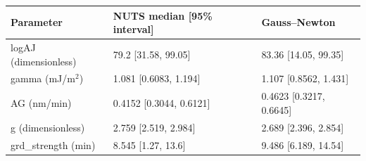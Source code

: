 \begin{tabular}{lll}
Parameter & NUTS median [95\% interval] & Gauss--Newton \\
\hline
logAJ (dimensionless) & 79.2 [31.58, 99.05] & 83.36 [14.05, 99.35] \\
gamma (mJ/m$^2$) & 1.081 [0.6083, 1.194] & 1.107 [0.8562, 1.431] \\
AG (nm/min) & 0.4152 [0.3044, 0.6121] & 0.4623 [0.3217, 0.6645] \\
g (dimensionless) & 2.759 [2.519, 2.984] & 2.689 [2.396, 2.854] \\
grd\_strength (min) & 8.545 [1.27, 13.6] & 9.486 [6.189, 14.54] \\
\end{tabular}
